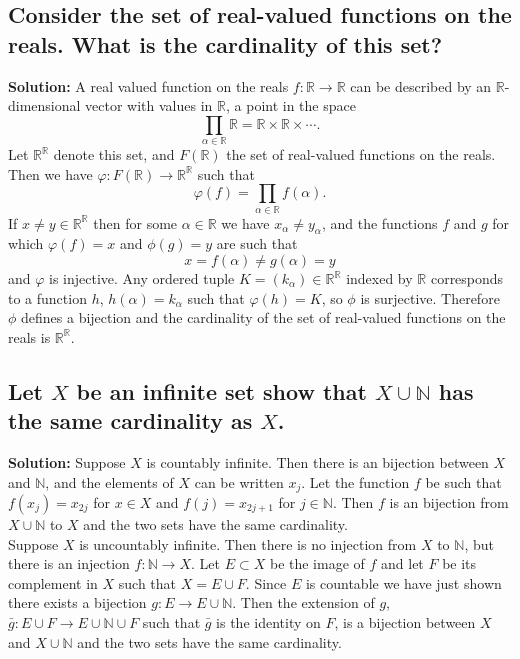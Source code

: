\documentclass{article}
\newcommand{\exercise}[1]{\subsection{\normalfont #1}}
\newcommand{\solution}{\indent\indent \textbf{Solution: }}
\begin{document}
\exercise{Consider the set of real-valued functions on the reals. What is the cardinality of this set?}
\solution 
A real valued function on the reals $f\colon \mathbb{R} \to \mathbb{R}$ can be described by an $\mathbb{R}$-dimensional vector with values in $\mathbb{R}$, a point in the space 
$$\prod_{\alpha \in \mathbb{R}} \mathbb{R} = \mathbb{R} \times \mathbb{R} \times \cdots.$$
\indent Let $\mathbb{R}^\mathbb{R}$ denote this set, and $F(\mathbb{R})$ the set of real-valued functions on the reals. Then we have $\varphi \colon F(\mathbb{R}) \to \mathbb{R}^\mathbb{R}$ such that 
$$\varphi(f) = \prod_{\alpha \in \mathbb{R}} f(\alpha).$$ 
\indent If $x\neq y \in \mathbb{R}^\mathbb{R}$ then for some $\alpha \in \mathbb{R}$ we have $x_\alpha \neq y_\alpha$, and the functions $f$ and $g$ for which $\varphi(f) =x$ and $\phi (g) = y$ are such that 
$$x = f(\alpha) \neq g(\alpha) = y$$
and $\varphi$ is injective. Any ordered tuple $K = (k_\alpha)\in\mathbb{R}^\mathbb{R}$ indexed by $\mathbb{R}$ corresponds to a function $h$, $h(\alpha) = k_\alpha$ such that $\varphi(h) = K$, so $\phi$ is surjective. Therefore $\phi$ defines a bijection and the cardinality of the set of real-valued functions on the reals is $\mathbb{R}^\mathbb{R}$. 

\exercise{Let $X$ be an infinite set show that $X\cup\mathbb{N}$ has the same cardinality as $X$.}
\solution Suppose $X$ is countably infinite. Then there is an bijection between $X$ and $\mathbb{N}$, and the elements of $X$ can be written $x_j$. Let the function $f$ be such that $f(x_j) = x_{2j}$ for $x\in X$ and $f(j) = x_{2j+1}$ for $j\in \mathbb{N}$. Then $f$ is an bijection from $X\cup \mathbb{N}$ to $X$ and the two sets have the same cardinality.  \\
\indent Suppose $X$ is uncountably infinite. Then there is no injection from $X$ to $\mathbb{N}$, but there is an injection $f\colon \mathbb{N}\to X$. Let $E\subset X$ be the image of $f$ and let $F$ be its complement in $X$ such that $X = E\cup F$. Since $E$ is countable we have just shown there exists a bijection $g\colon E\to E\cup \mathbb{N}$. Then the extension of $g$, $\bar g\colon E\cup F\to E\cup\mathbb{N}\cup F$ such that $\bar g$ is the identity on $F$, is a bijection between $X$ and $X\cup \mathbb{N}$ and the two sets have the same cardinality. 

\newpage
\end{document}
